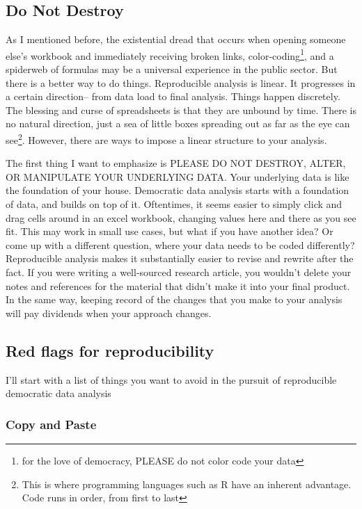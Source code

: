 \documentclass[]{book}
\begin{document}
\hypertarget{do-not-destroy}{%
\subsection{Do Not Destroy}\label{do-not-destroy}}

As I mentioned before, the existential dread that occurs when opening someone else's workbook and immediately receiving broken links, color-coding\footnote{for the love of democracy, PLEASE do not color code your data}, and a spiderweb of formulas may be a universal experience in the public sector. But there is a better way to do things. Reproducible analysis is linear. It progresses in a certain direction-- from data load to final analysis. Things happen discretely. The blessing and curse of spreadsheets is that they are unbound by time. There is no natural direction, just a sea of little boxes spreading out as far as the eye can see\footnote{This is where programming languages such as R have an inherent advantage. Code runs in order, from first to last}. However, there are ways to impose a linear structure to your analysis.

The first thing I want to emphasize is PLEASE DO NOT DESTROY, ALTER, OR MANIPULATE YOUR UNDERLYING DATA. Your underlying data is like the foundation of your house. Democratic data analysis starts with a foundation of data, and builds on top of it. Oftentimes, it seems easier to simply click and drag cells around in an excel workbook, changing values here and there as you see fit. This may work in small use cases, but what if you have another idea? Or come up with a different question, where your data needs to be coded differently? Reproducible analysis makes it substantially easier to revise and rewrite after the fact. If you were writing a well-sourced research article, you wouldn't delete your notes and references for the material that didn't make it into your final product. In the same way, keeping record of the changes that you make to your analysis will pay dividends when your approach changes.

\hypertarget{red-flags-for-reproducibility}{%
\subsection{Red flags for reproducibility}\label{red-flags-for-reproducibility}}

I'll start with a list of things you want to avoid in the pursuit of reproducible democratic data analysis

\hypertarget{copy-and-paste}{%
\subsubsection{Copy and Paste}\label{copy-and-paste}}
\end{document}
